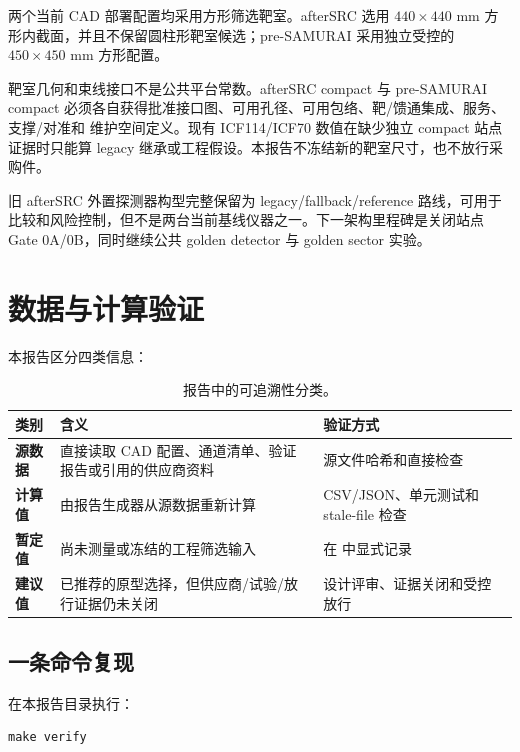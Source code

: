 \documentclass[UTF8,10pt,letterpaper,fontset=none]{ctexart}
\newcommand{\proposal}{\textsf{\bfseries 建议值}}
\newcommand{\derived}{\textsf{\bfseries 计算值}}
\newcommand{\sourcevalue}{\textsf{\bfseries 源数据}}
\newcommand{\provisional}{\textsf{\bfseries 暂定值}}
\begin{document}
两个当前 CAD 部署配置均采用方形筛选靶室。afterSRC 选用
$440\times440$ mm 方形内截面，并且不保留圆柱形靶室候选；pre-SAMURAI
采用独立受控的 $450\times450$ mm 方形配置。

靶室几何和束线接口不是公共平台常数。afterSRC compact 与 pre-SAMURAI compact
必须各自获得批准接口图、可用孔径、可用包络、靶/馈通集成、服务、支撑/对准和
维护空间定义。现有 ICF114/ICF70 数值在缺少独立 compact 站点证据时只能算
legacy 继承或工程假设。本报告不冻结新的靶室尺寸，也不放行采购件。

旧 afterSRC 外置探测器构型完整保留为 legacy/fallback/reference 路线，可用于
比较和风险控制，但不是两台当前基线仪器之一。下一架构里程碑是关闭站点
Gate 0A/0B，同时继续公共 golden detector 与 golden sector 实验。

\section{数据与计算验证}
\label{sec:verification-zh}

本报告区分四类信息：
\begin{table}[htbp]
  \centering
  \small
  \caption{报告中的可追溯性分类。}
  \begin{tabularx}{\textwidth}{L{0.17\textwidth}Y Y}
    \toprule
    类别 & 含义 & 验证方式 \\
    \midrule
    \sourcevalue & 直接读取 CAD 配置、通道清单、验证报告或引用的供应商资料 &
      源文件哈希和直接检查 \\
    \derived & 由报告生成器从源数据重新计算 &
      CSV/JSON、单元测试和 stale-file 检查 \\
    \provisional & 尚未测量或冻结的工程筛选输入 &
      在  中显式记录 \\
    \proposal & 已推荐的原型选择，但供应商/试验/放行证据仍未关闭 &
      设计评审、证据关闭和受控放行 \\
    \bottomrule
  \end{tabularx}
\end{table}

\subsection{一条命令复现}

在本报告目录执行：
\begin{Verbatim}[fontsize=\small,frame=single]
make verify
\end{Verbatim}
\end{document}
